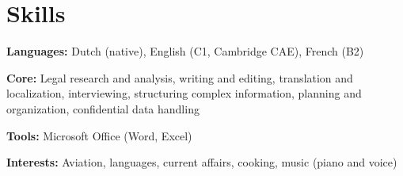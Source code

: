 \documentclass[10pt,letterpaper]{article}
\begin{document}
\section{Skills}
\textbf{Languages:} Dutch (native), English (C1, Cambridge CAE), French (B2)
\vspace{2pt}

\textbf{Core:} Legal research and analysis, writing and editing, translation and localization, interviewing, structuring complex information, planning and organization, confidential data handling
\vspace{2pt}

\textbf{Tools:} Microsoft Office (Word, Excel)
\vspace{2pt}

\textbf{Interests:} Aviation, languages, current affairs, cooking, music (piano and voice)
\end{document}
